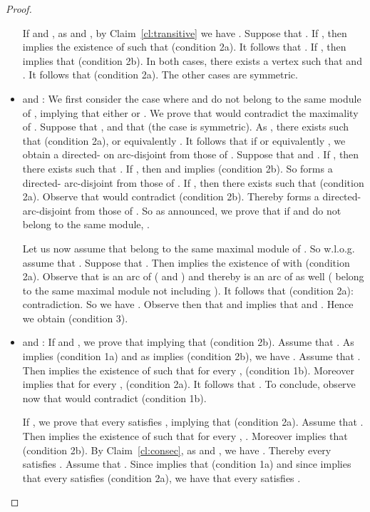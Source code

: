 \begin{proof}
\begin{proofclaim}
\begin{itemize}
If  and , as  and , by Claim~\ref{cl:transitive} we have . Suppose that . If , then  implies the existence of  such that  (condition 2a). It follows that . If , then  implies that  (condition 2b). In both cases, there exists a vertex  such that  and . It follows that  (condition 2a). The other cases are symmetric. 

\item  and : 
We first consider the case where  and  do not belong to the same module of , implying that either  or . We prove that  would contradict the maximality of . Suppose that ,  and that  (the case  is symmetric). As , there exists  such that  (condition 2a), or equivalently . It follows that if  or equivalently , we obtain a directed- on  arc-disjoint from those of . Suppose that  and . If , then there exists  such that . If , then  and  implies  (condition 2b). So  forms a directed- arc-disjoint from those of . If , then there exists  such that  (condition 2a). Observe that  would contradict  (condition 2b). Thereby  forms a directed- arc-disjoint from those of . So as announced, we prove that if  and  do not belong to the same module,  .

Let us now assume that  belong to the same maximal module  of . So w.l.o.g. assume that . Suppose that . Then  implies the existence of  with  (condition 2a). Observe that  is an arc of  ( and ) and thereby  is an arc of  as well ( belong to the same maximal module not including ). It follows that  (condition 2a): contradiction. So we have . Observe then that  and  implies that  and . Hence we obtain  (condition 3).


\item  and : If  and , we prove that  implying that  (condition 2b). Assume that . As  implies  (condition 1a) and as  implies  (condition 2b), we have . Assume that . Then  implies the existence of  such that for every ,  (condition 1b). Moreover  implies that for every ,  (condition 2a). It follows that . To conclude, observe now that  would contradict  (condition 1b). 



If , we prove that every  satisfies , implying that  (condition 2a). Assume that . Then  implies the existence of  such that for every , . Moreover  implies that  (condition 2b). By Claim~\ref{cl:consec}, as  and , we have . Thereby every  satisfies . Assume that . Since  implies that  (condition 1a) and since  implies that every  satisfies  (condition 2a), we have that every  satisfies . 




\end{itemize}
\end{proofclaim}
\end{proof}
